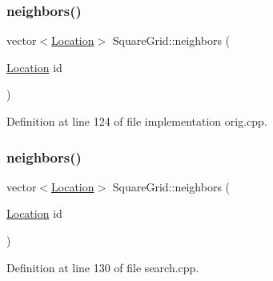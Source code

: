\mbox{\label{struct_square_grid_a106d76702d8c4acb03883c477db28e3a}} 
\subsubsection{\texorpdfstring{neighbors()}{neighbors()}\hspace{0.1cm}{\footnotesize\ttfamily [1/2]}}
{\footnotesize\ttfamily vector$<$\hyperlink{struct_square_grid_a2c9a2cbd3912aa48ac97289abc3f1c0f}{Location}$>$ Square\+Grid\+::neighbors (\begin{DoxyParamCaption}\item[{\hyperlink{struct_square_grid_a2c9a2cbd3912aa48ac97289abc3f1c0f}{Location}}]{id }\end{DoxyParamCaption})\hspace{0.3cm}{\ttfamily [inline]}}



Definition at line 124 of file implementation orig.\+cpp.

\mbox{\label{struct_square_grid_a106d76702d8c4acb03883c477db28e3a}} 
\subsubsection{\texorpdfstring{neighbors()}{neighbors()}\hspace{0.1cm}{\footnotesize\ttfamily [2/2]}}
{\footnotesize\ttfamily vector$<$\hyperlink{struct_square_grid_a2c9a2cbd3912aa48ac97289abc3f1c0f}{Location}$>$ Square\+Grid\+::neighbors (\begin{DoxyParamCaption}\item[{\hyperlink{struct_square_grid_a2c9a2cbd3912aa48ac97289abc3f1c0f}{Location}}]{id }\end{DoxyParamCaption})\hspace{0.3cm}{\ttfamily [inline]}}



Definition at line 130 of file search.\+cpp.

\mbox{\label{struct_square_grid_a3f638b46510dd880823b1acac75c7b96}} 
